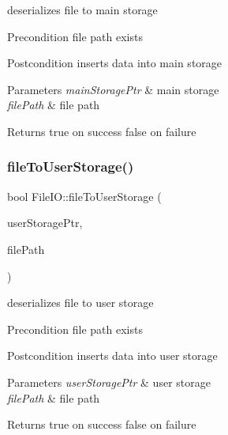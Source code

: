 deserializes file to main storage \begin{DoxyPrecond}{Precondition}
file path exists 
\end{DoxyPrecond}
\begin{DoxyPostcond}{Postcondition}
inserts data into main storage 
\end{DoxyPostcond}

\begin{DoxyParams}{Parameters}
{\em main\+Storage\+Ptr} & main storage \\
\hline
{\em file\+Path} & file path \\
\hline
\end{DoxyParams}
\begin{DoxyReturn}{Returns}
true on success false on failure 
\end{DoxyReturn}
\mbox{\label{class_file_i_o_a8b7bed16c531fc67ff4a59c85ebfff12}} 
\subsubsection{\texorpdfstring{file\+To\+User\+Storage()}{fileToUserStorage()}}
{\footnotesize\ttfamily bool File\+I\+O\+::file\+To\+User\+Storage (\begin{DoxyParamCaption}\item[{\hyperlink{class_user_storage}{User\+Storage} $\ast$}]{user\+Storage\+Ptr,  }\item[{std\+::string}]{file\+Path }\end{DoxyParamCaption})}

deserializes file to user storage \begin{DoxyPrecond}{Precondition}
file path exists 
\end{DoxyPrecond}
\begin{DoxyPostcond}{Postcondition}
inserts data into user storage 
\end{DoxyPostcond}

\begin{DoxyParams}{Parameters}
{\em user\+Storage\+Ptr} & user storage \\
\hline
{\em file\+Path} & file path \\
\hline
\end{DoxyParams}
\begin{DoxyReturn}{Returns}
true on success false on failure 
\end{DoxyReturn}
\mbox{\label{class_file_i_o_a07c62d532111ae359f3bc656acf8b27e}} 
